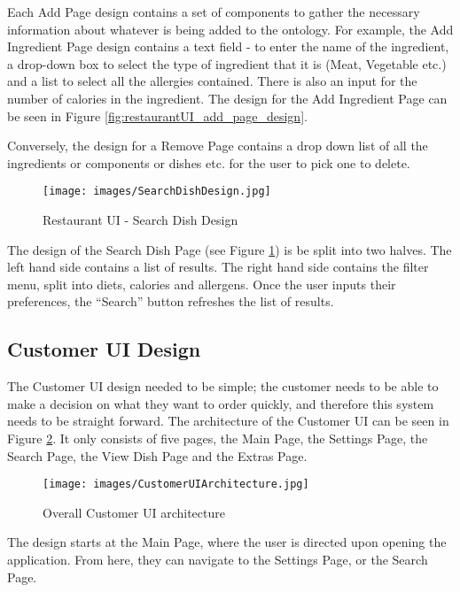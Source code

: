 Each Add Page design contains a set of components to gather the necessary information about whatever is being added to the ontology. For example, the Add Ingredient Page design contains a text field - to enter the name of the ingredient, a drop-down box to select the type of ingredient that it is (Meat, Vegetable etc.) and a list to select all the allergies contained. There is also an input for the number of calories in the ingredient. The design for the Add Ingredient Page can be seen in Figure \ref{fig:restaurantUI_add_page_design}.

Conversely, the design for a Remove Page contains a drop down list of all the ingredients or components or dishes etc. for the user to pick one to delete.

\begin{figure}[h]
    \centering
    \captionsetup{justification=centering}
    \texttt{[image: images/SearchDishDesign.jpg]}
    \caption{Restaurant UI - Search Dish Design}
    \label{fig:restaurantUI_query_page_design}
\end{figure}

The design of the Search Dish Page (see Figure \ref{fig:restaurantUI_query_page_design}) is be split into two halves. The left hand side contains a list of results. The right hand side contains the filter menu, split into diets, calories and allergens. Once the user inputs their preferences, the ``Search'' button refreshes the list of results.

\subsection{Customer UI Design}

The Customer UI design needed to be simple; the customer needs to be able to make a decision on what they want to order quickly, and therefore this system needs to be straight forward. The architecture of the Customer UI can be seen in Figure \ref{fig:customerUI_architecture}. It only consists of five pages, the Main Page, the Settings Page, the Search Page, the View Dish Page and the Extras Page.

\begin{figure}[h]
    \centering
    \captionsetup{justification=centering}
    \texttt{[image: images/CustomerUIArchitecture.jpg]}
    \caption{Overall Customer UI architecture}
    \label{fig:customerUI_architecture}
\end{figure}

The design starts at the Main Page, where the user is directed upon opening the application. From here, they can navigate to the Settings Page, or the Search Page. 

